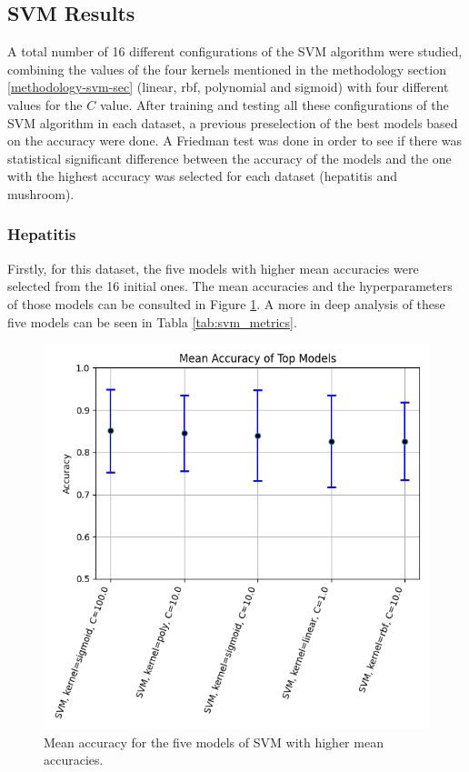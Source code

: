 \subsection{SVM Results}
A total number of 16 different configurations of the SVM algorithm were studied, combining the values of the four kernels mentioned in the methodology section \ref{methodology-svm-sec} (linear, rbf, polynomial and sigmoid) with four different values for the $C$ value. After training and testing all these configurations of the SVM algorithm in each dataset, a previous preselection of the best models based on the accuracy were done. A Friedman test was done in order to see if there was statistical significant difference between the accuracy of the models and the one with the highest accuracy was selected for each dataset (hepatitis and mushroom). 

\subsubsection{Hepatitis}
Firstly, for this dataset, the five models with higher mean accuracies were selected from the 16 initial ones. The mean accuracies and the hyperparameters of those models can be consulted in Figure \ref{fig:hep-svm-1}. A more in deep analysis of these five models can be seen in Tabla \ref{tab:svm_metrics}.

\begin{figure}[t]
    \centering
    \includegraphics[width=\textwidth]{figures/svm/hepatitis/statistical_analysis_results.png}
    \caption{Mean accuracy for the five models of SVM with higher mean accuracies.}
    \label{fig:hep-svm-1}
\end{figure}


